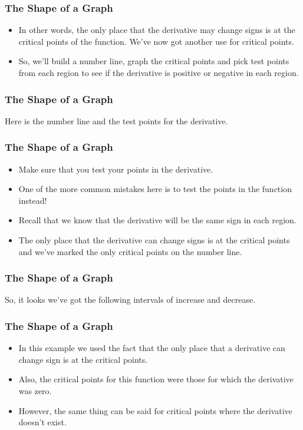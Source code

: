 \documentclass{beamer}
\begin{document}
\begin{frame} 
	\frametitle{The Shape of a Graph}
	\begin{itemize}
\item In other words, the only place that the derivative may change signs is at the critical points of the function.  We’ve now got another use for critical points. 
\item So, we’ll build a number line, graph the critical points and pick test points from each region to see if the derivative is positive or negative in each region.
\end{itemize}
\end{frame}
\begin{frame} 
	\frametitle{The Shape of a Graph}
Here is the number line and the test points for the derivative.

\end{frame}
\begin{frame} 
	\frametitle{The Shape of a Graph}
\begin{itemize}
\item Make sure that you test your points in the derivative.
\item One of the more common mistakes here is to test the points in the function instead!  
\item Recall that we know that the derivative will be the same sign in each region.
\item The only place that the derivative can change signs is at the critical points and we’ve marked the only critical points on the number line.
\end{itemize}
\end{frame}
\begin{frame} 
	\frametitle{The Shape of a Graph}
So, it looks we’ve got the following intervals of increase and decrease.



\end{frame}
\begin{frame} 
	\frametitle{The Shape of a Graph}
\begin{itemize}
\item In this example we used the fact that the only place that a derivative can change sign is at the critical points.
\item  Also, the critical points for this function were those for which the derivative was zero.
\item  However, the same thing can be said for critical points where the derivative doesn’t exist.  
\end{itemize}
\end{frame}
\end{document}
